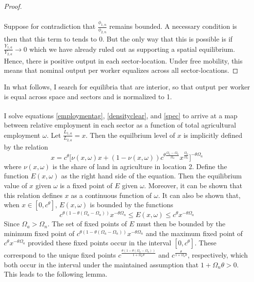 \documentclass[]{article}
\theoremstyle{plain}
\begin{document}
\begin{proof}
\paragraph*{}
Suppose for contradiction that $\frac{\phi_{1, n}}{\phi_{2,n}}$ remains bounded. A necessary condition is then that this term to tends to 0. But the only way that this is possible is if $\frac{Y_{1, a}}{Y_{2, a}} \to 0$ which we have already ruled out as supporting a spatial equilibrium. Hence, there is positive output in each sector-location. Under free mobility, this means that nominal output per worker equalizes across all sector-locations.
\end{proof}
In what follows, I search for equilibria that are interior, so that output per worker is equal across space and sectors and is normalized to 1. 

 \paragraph*{}
 I solve equations \eqref{employmentag}, \eqref{densityclear}, and \eqref{spec} to arrive at a map between relative employment in each sector as a function of total agricultural employment $\omega$. Let $\frac{L_{1, a}}{L_{2, a}} = x$. Then the equilbrium level of $x$ is implicitly defined by the relation 
 \begin{equation}
 	x = c^{\theta}\bigg[\nu(x, \omega)x + (1-\nu(x, \omega))c^{\theta\frac{\Omega_{a} - \Omega_{n}}{\Omega_{a}}}x^{\frac{\Omega_{n}}{\Omega_{a}}}\bigg]^{-\theta\Omega_{a}}
 \end{equation}
where $\nu(x, \omega)$ is the share of land in agriculture in location 2. Define the function $E(x, \omega)$ as the right hand side of the equation. Then the equilibrium value of $x$ given $\omega$ is a fixed point of $E$ given $\omega$. Moreover, it can be shown that this relation defines $x$ as a continuous function of $\omega$. It can also be shown that, when $x \in [0, c^{\theta}]$, $E(x, \omega)$ is bounded by the functions 
\begin{equation}
c^{\theta(1-\theta(\Omega_{a} - \Omega_{n}))}x^{-\theta\Omega_{n}} \leq E(x, \omega) \leq c^{\theta}x^{-\theta\Omega_{a}}
\end{equation}
 Since $\Omega_{a} > \Omega_{n}$. The set of fixed points of $E$ must then be bounded by the minimum fixed point of $c^{\theta(1-\theta(\Omega_{a} - \Omega_{n}))}x^{-\theta\Omega_{n}}$ and the maximum fixed point of $c^{\theta}x^{-\theta\Omega_{a}}$ provided these fixed points occur in the interval $[0, c^{\theta}]$. These correspond to the unique fixed points $c^{\frac{\theta(1-\theta(\Omega_{a}-\Omega_{n}))}{1 + \Omega_{n}\theta}}$ and $c^{\frac{\theta}{1 + \Omega_{a}\theta}}$, respectively, which both occur in the interval under the maintained assumption that $1 + \Omega_{n}\theta > 0$. This leads to the following lemma.
\end{document}
